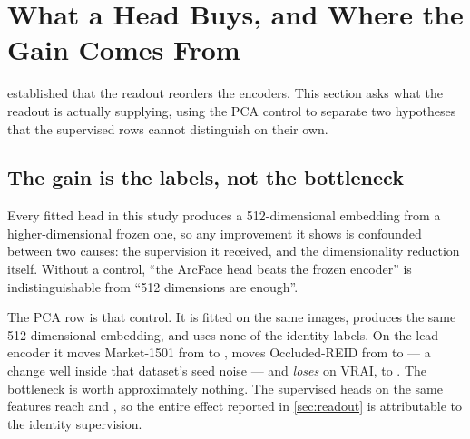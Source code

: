 \section{What a Head Buys, and Where the Gain Comes From}\label{sec:heads}
 established that the readout reorders the encoders. This section asks what
the readout is actually supplying, using the PCA control to separate two hypotheses that the
supervised rows cannot distinguish on their own.

\begin{table}[t]
\centering
\caption{The lead encoder (C-RADIOv4-H at $224\times224$) under all four \texttt{market1501/train}-fitted readouts, mAP. Only
the Market-1501 column is in-domain; every other column applies the same Market-fitted head to
a domain whose labels it has never seen. The PCA row is the matched control --- same images,
same output dimension, no labels.}
\label{tab:heads}
\scriptsize
\setlength{\tabcolsep}{3pt}

\end{table}

\subsection{The gain is the labels, not the bottleneck}
Every fitted head in this study produces a 512-dimensional embedding from a
higher-dimensional frozen one, so any improvement it shows is confounded between two causes:
the supervision it received, and the dimensionality reduction itself. Without a control, ``the
ArcFace head beats the frozen encoder'' is indistinguishable from ``512 dimensions are enough''.

The PCA row is that control. It is fitted on the same \nHeadImages{} images, produces the same
512-dimensional embedding, and uses none of the \nHeadIdentities{} identity labels. On
the lead encoder it moves Market-1501 from \leadMarketFrozen{} to \leadMarketPCA{}, moves
Occluded-REID from \leadOccludedFrozen{} to \leadOccludedPCA{} --- a change well inside that
dataset's seed noise --- and \emph{loses} on VRAI, \leadVraiFrozen{} to \leadVraiPCA{}. The
bottleneck is worth approximately nothing. The supervised heads on the same features reach
\leadMarketLinear{} and \leadMarketArc{}, so the entire effect reported in \cref{sec:readout}
is attributable to the identity supervision.

\begin{table}[t]
\centering
\caption{The same recipe fitted on each of two training splits, read on both of them, on the
lead encoder. The diagonal is in-domain. Every off-diagonal cell is the same recipe, the same
encoder, the same fitting budget and the same test set, and differs only in where the head was
fitted --- which is what makes this a control rather than a comparison.}
\label{tab:fitsplit}
\small

\end{table}

